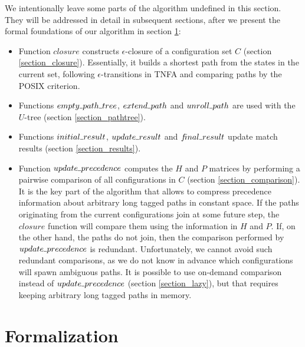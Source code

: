 \documentclass[AMA,STIX1COL]{WileyNJD-v2}
\newcommand{\Xund}{\rule{.4em}{.4pt}}
\begin{document}
We intentionally leave some parts of the algorithm undefined in this section.
They will be addressed in detail in subsequent sections,
after we present the formal foundations of our algorithm in section \ref{section_formalization}:

\begin{itemize}[itemsep=0.2em, topsep=0.5em]
    \item Function $closure$ constructs $\epsilon$-closure of a configuration set $C$ (section \ref{section_closure}).
        Essentially, it builds a shortest path from the states in the current set,
        following $\epsilon$-transitions in TNFA
        and comparing paths by the POSIX criterion.

    \item Functions $empty \Xund path \Xund tree$, $extend \Xund path$ and $unroll \Xund path$
        are used with the $U$-tree
        (section \ref{section_pathtree}).

    \item Functions $initial \Xund result$, $update \Xund result$ and $f\!inal \Xund result$
        update match results (section \ref{section_results}).

    \item Function $update \Xund precedence$ computes the $H$ and $P$ matrices
        by performing a pairwise comparison of all configurations in $C$ (section \ref{section_comparison}).
        It is the key part of the algorithm that allows to compress precedence information about arbitrary long tagged paths in constant space.
        If the paths originating from the current configurations join at some future step,
        the $closure$ function will compare them using the information in $H$ and $P$.
        If, on the other hand, the paths do not join, then the comparison performed by $update \Xund precedence$ is redundant.
        Unfortunately, we cannot avoid such redundant comparisons,
        as we do not know in advance which configurations will spawn ambiguous paths.
        It is possible to use on-demand comparison instead of $update \Xund precedence$ (section \ref{section_lazy}),
        but that requires keeping arbitrary long tagged paths in memory.
    \\[-0.5em]
\end{itemize}


\section{Formalization}\label{section_formalization}
\end{document}
